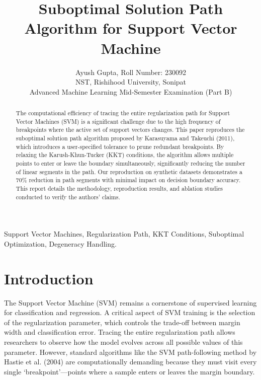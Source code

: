 \documentclass[journal,10pt,twocolumn,oneside]{IEEEtran}
\begin{document}
\title{Suboptimal Solution Path Algorithm for Support Vector Machine}

\author{Ayush Gupta, Roll Number: 230092\\
NST, Rishihood University, Sonipat\\
Advanced Machine Learning Mid-Semester Examination (Part B)}

\maketitle

\begin{abstract}
The computational efficiency of tracing the entire regularization path for Support Vector Machines (SVM) is a significant challenge due to the high frequency of breakpoints where the active set of support vectors changes. This paper reproduces the suboptimal solution path algorithm proposed by Karasuyama and Takeuchi (2011), which introduces a user-specified tolerance to prune redundant breakpoints. By relaxing the Karush-Khun-Tucker (KKT) conditions, the algorithm allows multiple points to enter or leave the boundary simultaneously, significantly reducing the number of linear segments in the path. Our reproduction on synthetic datasets demonstrates a 70\% reduction in path segments with minimal impact on decision boundary accuracy. This report details the methodology, reproduction results, and ablation studies conducted to verify the authors' claims.
\end{abstract}

\begin{IEEEkeywords}
Support Vector Machines, Regularization Path, KKT Conditions, Suboptimal Optimization, Degeneracy Handling.
\end{IEEEkeywords}

\section{Introduction}
The Support Vector Machine (SVM) remains a cornerstone of supervised learning for classification and regression. A critical aspect of SVM training is the selection of the regularization parameter, which controls the trade-off between margin width and classification error. Tracing the entire regularization path allows researchers to observe how the model evolves across all possible values of this parameter. However, standard algorithms like the SVM path-following method by Hastie et al. (2004) are computationally demanding because they must visit every single `breakpoint'---points where a sample enters or leaves the margin boundary.
\end{document}
